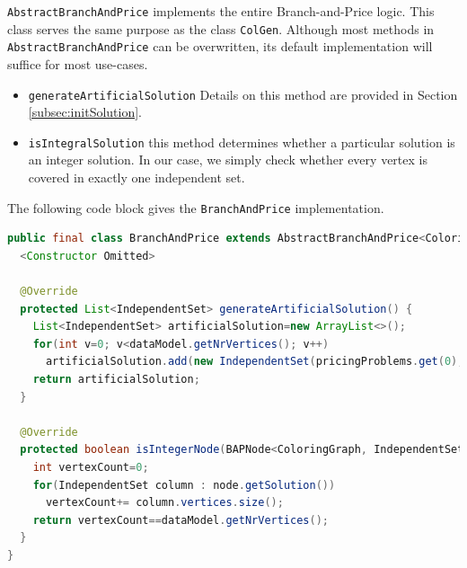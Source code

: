 \documentclass[a4paper]{article}
\newenvironment{myblock}[1]{%
    \tcolorbox[beamer,%
    noparskip,breakable,
    colback=lightBlueCodeBlock,colframe=darkBlueCodeBlock,%
    colbacklower=darkBlueCodeBlock!75!lightBlueCodeBlock,%
    coltitle=blueTitleCodeBlock,
    title=#1]}%
    {\endtcolorbox}
\newcommand{\code}[1]{\lstinline[language=java, style=seminar]!#1!}
\begin{document}
\code{AbstractBranchAndPrice} implements the entire Branch-and-Price logic. This class serves the same purpose as the class \code{ColGen}. Although most methods in \code{AbstractBranchAndPrice} can be overwritten, its default implementation will suffice for most use-cases. \begin{itemize}
 \item \code{generateArtificialSolution} Details on this method are provided in Section \ref{subsec:initSolution}.
 \item \code{isIntegralSolution} this method determines whether a particular solution is an integer solution. In our case, we simply check whether every vertex is covered in exactly one independent set.
\end{itemize}
The following code block gives the \code{BranchAndPrice} implementation.
\begin{myblock}{BranchAndPrice}
\begin{lstlisting}[language=java, style=eclipseArticle, xleftmargin=2em]  
public final class BranchAndPrice extends AbstractBranchAndPrice<ColoringGraph, IndependentSet, ChromaticNumberPricingProblem>{
  <Constructor Omitted>

  @Override
  protected List<IndependentSet> generateArtificialSolution() {
    List<IndependentSet> artificialSolution=new ArrayList<>();
    for(int v=0; v<dataModel.getNrVertices(); v++)
      artificialSolution.add(new IndependentSet(pricingProblems.get(0), true, "Artificial", new HashSet<>(Collections.singletonList(v)), objectiveIncumbentSolution));
    return artificialSolution;
  }

  @Override
  protected boolean isIntegerNode(BAPNode<ColoringGraph, IndependentSet> node) {
    int vertexCount=0;
    for(IndependentSet column : node.getSolution())
      vertexCount+= column.vertices.size();
    return vertexCount==dataModel.getNrVertices();
  }
}
\end{lstlisting}
\end{myblock}
\end{document}
